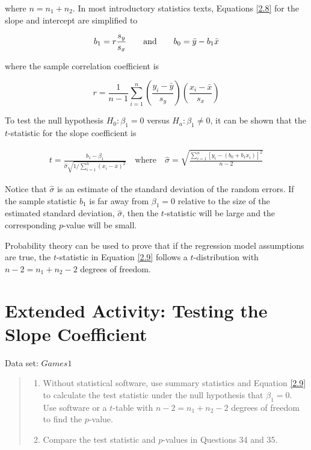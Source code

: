 \documentclass[
]{report}
\providecommand{\tightlist}{%
  \setlength{\itemsep}{0pt}\setlength{\parskip}{0pt}}
\begin{document}
where \(n = n_1 + n_2\). In most introductory statistics texts, Equations \ref{2.8} for the slope and intercept are simplified to

\begin{align}
b_1 = r \frac{s_y}{s_x}
\qquad \text{and} \qquad
b_0 = \bar{y} - b_1 \bar{x} 
\notag
\end{align}

where the sample correlation coefficient is

\[
r = \frac{1}{n - 1} \sum_{i=1}^{n} \left(\frac{y_i - \bar{y}}{s_y}\right) \left(\frac{x_i - \bar{x}}{s_x}\right)
\]

To test the null hypothesis \(H_0\!:\! \beta_1 = 0\) versus \(H_a\!:\! \beta_1 \ne 0\), it can be shown that the \(t\)-statistic for the slope coefficient is

\begin{align} \label{2.9}
t = \frac{b_1 - \beta_1}{\hat{\sigma} \sqrt{1 / \sum_{i=1}^{n}(x_i - \bar{x})^2}} \quad \text{where} \quad \hat{\sigma} = \sqrt{\frac{\sum_{i=1}^{n}[y_i - (b_0 + b_1 x_i)]^2}{n-2}}
\tag{2.9}
\end{align}

Notice that \(\hat{\sigma}\) is an estimate of the standard deviation of the random errors. If the sample statistic \(b_1\) is far away from \(\beta_1 = 0\) relative to the size of the estimated standard deviation, \(\hat{\sigma}\), then the \(t\)-statistic will be large and the corresponding \(p\)-value will be small.

Probability theory can be used to prove that if the regression model assumptions are true, the \(t\)-statistic in Equation \ref{2.9} follows a \(t\)-distribution with \(n - 2 = n_1 + n_2 - 2\) degrees of freedom.

\section*{Extended Activity: Testing the Slope Coefficient}\label{extended-activity-testing-the-slope-coefficient}

Data set: \(Games1\)

\begin{quote}
\begin{enumerate}
\def\labelenumi{\arabic{enumi}.}
\setcounter{enumi}{34}
\tightlist
\item
  Without statistical software, use summary statistics and Equation \ref{2.9} to calculate the test statistic under the null hypothesis that \(\beta_1 = 0\). Use software or a \(t\)-table with \(n - 2 = n_1 + n_2 - 2\) degrees of freedom to find the \(p\)-value.
\item
  Compare the test statistic and \(p\)-values in Questions 34 and 35.
\end{enumerate}
\end{quote}
\end{document}

